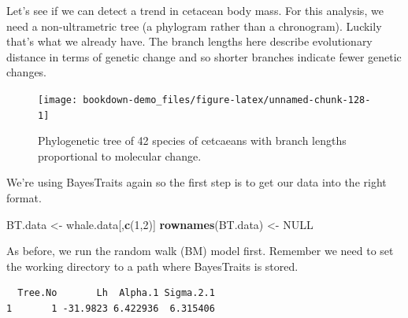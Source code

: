 \documentclass[
]{book}
\newenvironment{Shaded}{\begin{snugshade}}{\end{snugshade}}
\newcommand{\DecValTok}[1]{\textcolor[rgb]{0.00,0.00,0.81}{#1}}
\newcommand{\KeywordTok}[1]{\textcolor[rgb]{0.13,0.29,0.53}{\textbf{#1}}}
\newcommand{\NormalTok}[1]{#1}
\newcommand{\OperatorTok}[1]{\textcolor[rgb]{0.81,0.36,0.00}{\textbf{#1}}}
\newcommand{\OtherTok}[1]{\textcolor[rgb]{0.56,0.35,0.01}{#1}}
\newcommand{\StringTok}[1]{\textcolor[rgb]{0.31,0.60,0.02}{#1}}
\begin{document}
Let's see if we can detect a trend in cetacean body mass. For this analysis, we need a non-ultrametric tree (a phylogram rather than a chronogram). Luckily that's what we already have. The branch lengths here describe evolutionary distance in terms of genetic change and so shorter branches indicate fewer genetic changes.

\begin{figure}[H]

{\centering \texttt{[image: bookdown-demo\_files/figure-latex/unnamed-chunk-128-1]} 

}

\caption{Phylogenetic tree of 42 species of cetcaeans with branch lengths proportional to molecular change.}\label{fig:unnamed-chunk-128}
\end{figure}

We're using BayesTraits again so the first step is to get our data into the right format.

\begin{Shaded}
\begin{Highlighting}[]
\NormalTok{BT.data \textless{}{-}}\StringTok{ }\NormalTok{whale.data[,}\KeywordTok{c}\NormalTok{(}\DecValTok{1}\NormalTok{,}\DecValTok{2}\NormalTok{)]}
\KeywordTok{rownames}\NormalTok{(BT.data) \textless{}{-}}\StringTok{ }\OtherTok{NULL}
\end{Highlighting}
\end{Shaded}

As before, we run the random walk (BM) model first. Remember we need to set the working directory to a path where BayesTraits is stored.

\begin{Shaded}
\end{Shaded}

\begin{verbatim}
  Tree.No       Lh  Alpha.1 Sigma.2.1
1       1 -31.9823 6.422936  6.315406
\end{verbatim}
\end{document}

